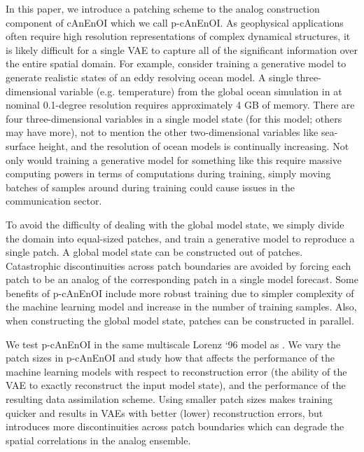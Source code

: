 \documentclass[final,3p]{elsarticle}
\theoremstyle{break}
\begin{document}
In this paper, we introduce a patching scheme to the analog construction component of cAnEnOI which we call p-cAnEnOI.
As geophysical applications often require high resolution representations of complex dynamical structures, it is likely difficult for a single VAE to capture all of the significant information over the entire spatial domain.
For example, consider training a generative model to generate realistic states of an eddy resolving ocean model.
A single three-dimensional variable (e.g. temperature) from the global ocean simulation in \cite{johnson2016climatological} at nominal 0.1-degree resolution requires approximately 4 GB of memory.
There are four three-dimensional variables in a single model state (for this model; others may have more), not to mention the other two-dimensional variables like sea-surface height, and the resolution of ocean models is continually increasing.
Not only would training a generative model for something like this require massive computing powers in terms of computations during training, simply moving batches of samples around during training could cause issues in the communication sector.

To avoid the difficulty of dealing with the global model state, we simply divide the domain into equal-sized patches, and train a generative model to reproduce a single patch.
A global model state can be constructed out of patches.
Catastrophic discontinuities across patch boundaries are avoided by forcing each patch to be an analog of the corresponding patch in a single model forecast.
Some benefits of p-cAnEnOI include more robust training due to simpler complexity of the machine learning model and increase in the number of training samples.
Also, when constructing the global model state, patches can be constructed in parallel.

We test p-cAnEnOI in the same multiscale Lorenz `96 model as \cite{grooms2020analog}.
We vary the patch sizes in p-cAnEnOI and study how that affects the performance of the machine learning models with respect to reconstruction error (the ability of the VAE to exactly reconstruct the input model state), and the performance of the resulting data assimilation scheme. 
Using smaller patch sizes makes training quicker and results in VAEs with better (lower) reconstruction errors, but introduces more discontinuities across patch boundaries which can degrade the spatial correlations in the analog ensemble. \par
\end{document}
